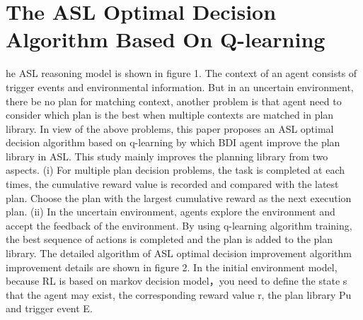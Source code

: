 \documentclass{article}
\begin{document}
\section{The ASL Optimal Decision Algorithm Based On
Q-learning}
he ASL reasoning model is shown in figure 1. The context of an
agent consists of trigger events and environmental information.
But in an uncertain environment, there be no plan for matching
context, another problem is that agent need to consider which plan
is the best when multiple contexts are matched in plan library. In
view of the above problems, this paper proposes an ASL optimal
decision algorithm based on q-learning by which BDI agent
improve the plan library in ASL. This study mainly improves the
planning library from two aspects. (i) For multiple plan decision
problems, the task is completed at each times, the cumulative
reward value is recorded and compared with the latest plan.
Choose the plan with the largest cumulative reward as the next
execution plan. (ii) In the uncertain environment, agents explore
the environment and accept the feedback of the environment. By
using q-learning algorithm training, the best sequence of actions is
completed and the plan is added to the plan library.
The detailed algorithm of ASL optimal decision improvement
algorithm improvement details are shown in figure 2. In the initial
environment model, because RL is based on markov decision
model，you need to define the state s that the agent may exist, the
corresponding reward value r, the plan library Pu and trigger
event E.
\end{document}
